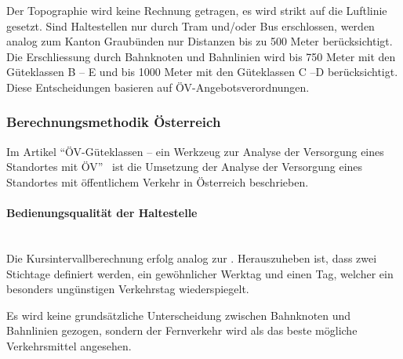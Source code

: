 Der Topographie wird keine Rechnung getragen, es wird strikt auf die Luftlinie gesetzt.
Sind Haltestellen nur durch Tram und/oder Bus erschlossen, werden analog zum Kanton Graubünden nur Distanzen bis zu 500 Meter berücksichtigt.
Die Erschliessung durch Bahnknoten und Bahnlinien wird bis 750 Meter mit den Güteklassen B -- E und bis 1000 Meter mit den Güteklassen C --D berücksichtigt.
Diese Entscheidungen basieren auf ÖV-Angebotsverordnungen.

\subsubsection{Berechnungsmethodik Österreich}
\label{Lösungsansätze:Berechnungsmethodik Österreich}

Im Artikel "`\acs{ÖV}-Güteklassen – ein Werkzeug zur Analyse der 
Versorgung eines Standortes mit ÖV"'~\cite{berechnung_oesterreich} ist die Umsetzung der Analyse der Versorgung eines Standortes mit öffentlichem Verkehr in Österreich beschrieben.

\paragraph{Bedienungsqualität der Haltestelle}~\\
\label{Berechnungsmethodik Österreich:Bedienungsqualität der Haltestelle}
Die Kursintervallberechnung erfolg analog zur .
Herauszuheben ist, dass zwei Stichtage definiert werden, ein gewöhnlicher Werktag und einen Tag, welcher ein besonders ungünstigen Verkehrstag wiederspiegelt.

Es wird keine grundsätzliche Unterscheidung zwischen Bahnknoten und Bahnlinien gezogen, sondern der Fernverkehr wird als das beste mögliche Verkehrsmittel angesehen.

